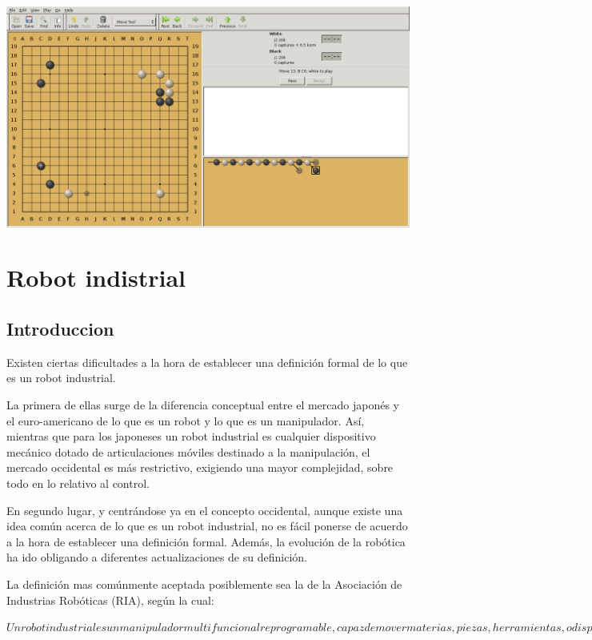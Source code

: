 \documentclass[12pt,a4paper]{report}
\begin{document}
\includegraphics[scale=0.33]{quarry.png}


\chapter{Robot indistrial}

\section{Introduccion}

Existen ciertas dificultades a la hora de establecer una definición formal de lo
que es un robot industrial. 

La primera de ellas surge de la diferencia
conceptual entre el mercado japonés y el euro-americano de lo que es un robot y
lo que es un manipulador. Así, mientras que para los japoneses un robot
industrial es cualquier dispositivo mecánico dotado de articulaciones móviles
destinado a la manipulación, el mercado occidental es más restrictivo, exigiendo
una mayor complejidad, sobre todo en lo relativo al control. 

En segundo lugar, y
centrándose ya en el concepto occidental, aunque existe una idea común acerca de
lo que es un robot industrial, no es fácil ponerse de acuerdo a la hora de
establecer una definición formal. Además, la evolución de la robótica ha ido
obligando a diferentes actualizaciones de su definición.

La definición mas comúnmente aceptada posiblemente sea la de la Asociación de
Industrias Robóticas (RIA), según la cual:

$Un robot industrial es un manipulador multifuncional reprogramable, capaz de
mover materias, piezas, herramientas, o dispositivos especiales, según
trayectorias variables, programadas para realizar tareas diversas.$
\end{document}
